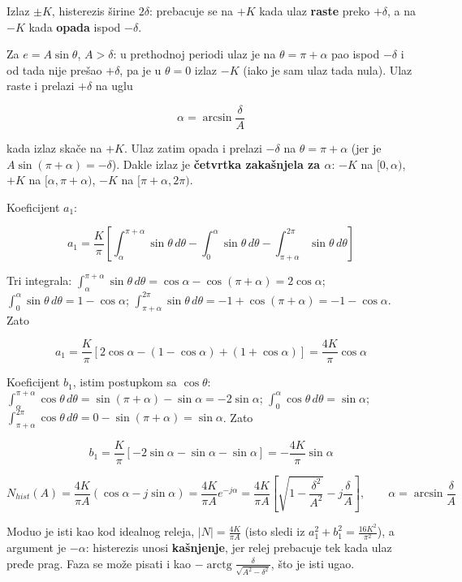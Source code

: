 \documentclass[11pt,a4paper,parskip=half,headsepline,numbers=noenddot]{scrartcl}
\begin{document}
Izlaz \(\pm K\), histerezis širine \(2\delta\): prebacuje se na \(+K\) kada ulaz \textbf{raste} preko \(+\delta\), a na \(-K\) kada \textbf{opada} ispod \(-\delta\).

Za \(e = A\sin\theta\), \(A > \delta\): u prethodnoj periodi ulaz je na \(\theta = \pi + \alpha\) pao ispod \(-\delta\) i od tada nije prešao \(+\delta\), pa je u \(\theta = 0\) izlaz \(-K\) (iako je sam ulaz tada nula). Ulaz raste i prelazi \(+\delta\) na uglu

\[\alpha = \arcsin\frac{\delta}{A}\]

kada izlaz skače na \(+K\). Ulaz zatim opada i prelazi \(-\delta\) na \(\theta = \pi + \alpha\) (jer je \(A\sin(\pi + \alpha) = -\delta\)). Dakle izlaz je \textbf{četvrtka zakašnjela za \(\alpha\)}: \(-K\) na \([0, \alpha)\), \(+K\) na \([\alpha, \pi + \alpha)\), \(-K\) na \([\pi + \alpha, 2\pi)\).

Koeficijent \(a_1\):

\[a_1 = \frac{K}{\pi}\left[\int_\alpha^{\pi + \alpha}\sin\theta\,d\theta - \int_0^\alpha\sin\theta\,d\theta - \int_{\pi + \alpha}^{2\pi}\sin\theta\,d\theta\right]\]

Tri integrala: \(\int_\alpha^{\pi+\alpha}\sin\theta\,d\theta = \cos\alpha - \cos(\pi + \alpha) = 2\cos\alpha\); \(\int_0^\alpha\sin\theta\,d\theta = 1 - \cos\alpha\); \(\int_{\pi+\alpha}^{2\pi}\sin\theta\,d\theta = -1 + \cos(\pi + \alpha) = -1 - \cos\alpha\). Zato

\[a_1 = \frac{K}{\pi}\left[2\cos\alpha - (1 - \cos\alpha) + (1 + \cos\alpha)\right] = \frac{4K}{\pi}\cos\alpha\]

Koeficijent \(b_1\), istim postupkom sa \(\cos\theta\): \(\int_\alpha^{\pi+\alpha}\cos\theta\,d\theta = \sin(\pi + \alpha) - \sin\alpha = -2\sin\alpha\); \(\int_0^\alpha\cos\theta\,d\theta = \sin\alpha\); \(\int_{\pi+\alpha}^{2\pi}\cos\theta\,d\theta = 0 - \sin(\pi + \alpha) = \sin\alpha\). Zato

\[b_1 = \frac{K}{\pi}\left[-2\sin\alpha - \sin\alpha - \sin\alpha\right] = -\frac{4K}{\pi}\sin\alpha\]

\begin{kljucna}
\[N_{hist}(A) = \frac{4K}{\pi A}\left(\cos\alpha - j\sin\alpha\right) = \frac{4K}{\pi A}e^{-j\alpha} = \frac{4K}{\pi A}\left[\sqrt{1 - \frac{\delta^2}{A^2}} - j\frac{\delta}{A}\right], \qquad \alpha = \arcsin\frac{\delta}{A}\]
\end{kljucna}

Moduo je isti kao kod idealnog releja, \(|N| = \frac{4K}{\pi A}\) (isto sledi iz \(a_1^2 + b_1^2 = \frac{16K^2}{\pi^2}\)), a argument je \(-\alpha\): histerezis unosi \textbf{kašnjenje}, jer relej prebacuje tek kada ulaz pređe prag. Faza se može pisati i kao \(-\operatorname{arctg}\frac{\delta}{\sqrt{A^2 - \delta^2}}\), što je isti ugao.
\end{document}
